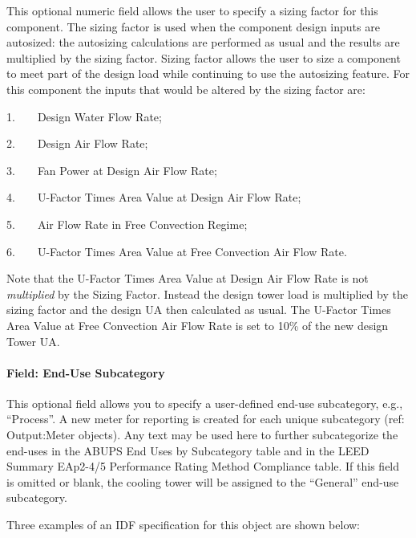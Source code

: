 This optional numeric field allows the user to specify a sizing factor for this component. The sizing factor is used when the component design inputs are autosized: the autosizing calculations are performed as usual and the results are multiplied by the sizing factor. Sizing factor allows the user to size a component to meet part of the design load while continuing to use the autosizing feature. For this component the inputs that would be altered by the sizing factor are:

1.~~~~Design Water Flow Rate;

2.~~~~Design Air Flow Rate;

3.~~~~Fan Power at Design Air Flow Rate;

4.~~~~U-Factor Times Area Value at Design Air Flow Rate;

5.~~~~Air Flow Rate in Free Convection Regime;

6.~~~~U-Factor Times Area Value at Free Convection Air Flow Rate.

Note that the U-Factor Times Area Value at Design Air Flow Rate is not \emph{multiplied} by the Sizing Factor. Instead the design tower load is multiplied by the sizing factor and the design UA then calculated as usual. The U-Factor Times Area Value at Free Convection Air Flow Rate is set to 10\% of the new design Tower UA.

\paragraph{Field: End-Use Subcategory}\label{end-use-subcategory-01}

This optional field allows you to specify a user-defined end-use subcategory, e.g., ``Process''. A new meter for reporting is created for each unique subcategory (ref: Output:Meter objects). Any text may be used here to further subcategorize the end-uses in the ABUPS End Uses by Subcategory table and in the LEED Summary EAp2-4/5 Performance Rating Method Compliance table. If this field is omitted or blank, the cooling tower will be assigned to the ``General'' end-use subcategory.


Three examples of an IDF specification for this object are shown below:

